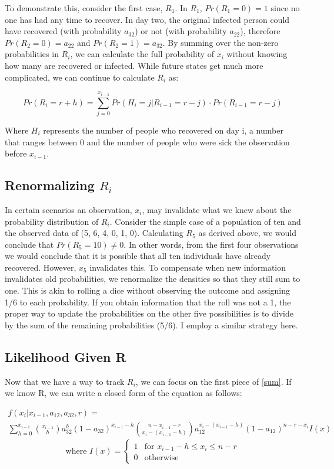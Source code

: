 \documentclass{svproc}
\begin{document}
To demonstrate this, consider the first case, $R_1$. In $R_1$, $Pr(R_1=0)=1$ since no one has had any time to recover. In day two, the original infected person could have recovered (with probability $a_{32}$) or not (with probability $a_{22}$), therefore $Pr(R_2=0) = a_{22}$ and $Pr(R_2=1)=a_{32}$. By summing over the non-zero probabilities in $R_i$, we can calculate the full probability of $x_i$ without knowing how many are recovered or infected. While future states get much more complicated, we can continue to calculate $R_i$ as:

\begin{equation}
Pr(R_i = r + h) = \sum_{j=0}^{x_{i-1}} Pr(H_i=j|R_{i-1}=r-j)\cdot Pr(R_{i-1}=r-j)
\end{equation}

Where $H_i$ represents the number of people who recovered on day i, a number that ranges between 0 and the number of people who were sick the observation before $x_{i-1}$.

\subsection*{Renormalizing $R_i$}
In certain scenarios an observation, $x_i$, may invalidate what we knew about the probability distribution of $R_i$. Consider the simple case of a population of ten and the observed data of (5, 6, 4, 0, 1, 0). Calculating $R_5$ as derived above, we would conclude that $Pr(R_5 =10)\neq 0$. In other words, from the first four observations we would conclude that it is possible that all ten individuals have already recovered. However, $x_5$ invalidates this. To compensate when new information invalidates old  probabilities, we renormalize the densities so that they still sum to one. This is akin to rolling a dice without observing the outcome and assigning 1/6 to each probability. If you obtain information that the roll was not a 1, the proper way to update the probabilities on the other five possibilities is to divide by the sum of the remaining probabilities (5/6). I employ a similar strategy here.

\subsection*{Likelihood Given R}
Now that we have a way to track $R_i$, we can focus on the first piece of \eqref{sum}. If we know R, we can write a closed form of the equation as follows:

\begin{multline}
f(x_i|x_{i-1}, a_{12}, a_{32}, r) = \\ \sum_{h=0}^{x_{i-1}}       {{x_{i-1}}\choose{h}} a_{32}^h(1-a_{32})^{x_{i-1}-h}  {{n-x_{i-1}-r}\choose{x_i-(x_{i-1}-h)}}  a_{12}^{x_i-(x_{i-1}-h)} (1-a_{12})^{n - r - x_i}I(x)  \end{multline} $$
\text{where } I(x) = \begin{cases} 1 & \text{for } x_{i-1}-h\leq x_i\leq n-r  \\ 0 &\text{otherwise} \end{cases}$$
\end{document}
